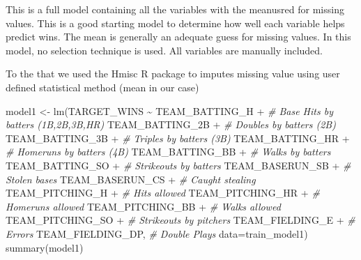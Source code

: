 \documentclass[
]{article}
\newenvironment{Shaded}{\begin{snugshade}}{\end{snugshade}}
\newcommand{\AttributeTok}[1]{\textcolor[rgb]{0.77,0.63,0.00}{#1}}
\newcommand{\CommentTok}[1]{\textcolor[rgb]{0.56,0.35,0.01}{\textit{#1}}}
\newcommand{\FunctionTok}[1]{\textcolor[rgb]{0.00,0.00,0.00}{#1}}
\newcommand{\NormalTok}[1]{#1}
\newcommand{\OtherTok}[1]{\textcolor[rgb]{0.56,0.35,0.01}{#1}}
\newcommand{\SpecialCharTok}[1]{\textcolor[rgb]{0.00,0.00,0.00}{#1}}
\begin{document}
This is a full model containing all the variables with the meanusred for
missing values. This is a good starting model to determine how well each
variable helps predict wins. The mean is generally an adequate guess for
missing values. In this model, no selection technique is used. All
variables are manually included.

To the that we used the Hmisc R package to imputes missing value using
user defined statistical method (mean in our case)

\begin{Shaded}
\begin{Highlighting}[]
\NormalTok{model1 }\OtherTok{\textless{}{-}} \FunctionTok{lm}\NormalTok{(TARGET\_WINS }\SpecialCharTok{\textasciitilde{}} 
\NormalTok{               TEAM\_BATTING\_H }\SpecialCharTok{+}   \CommentTok{\# Base Hits by batters (1B,2B,3B,HR)}
\NormalTok{               TEAM\_BATTING\_2B }\SpecialCharTok{+}  \CommentTok{\# Doubles by batters (2B) }
\NormalTok{               TEAM\_BATTING\_3B }\SpecialCharTok{+}  \CommentTok{\# Triples by batters (3B)}
\NormalTok{               TEAM\_BATTING\_HR }\SpecialCharTok{+}  \CommentTok{\# Homeruns by batters (4B) }
\NormalTok{               TEAM\_BATTING\_BB }\SpecialCharTok{+}  \CommentTok{\# Walks by batters}
\NormalTok{               TEAM\_BATTING\_SO }\SpecialCharTok{+}  \CommentTok{\# Strikeouts by batters }
\NormalTok{               TEAM\_BASERUN\_SB }\SpecialCharTok{+}  \CommentTok{\# Stolen bases}
\NormalTok{               TEAM\_BASERUN\_CS }\SpecialCharTok{+}  \CommentTok{\# Caught stealing }
\NormalTok{               TEAM\_PITCHING\_H }\SpecialCharTok{+}  \CommentTok{\# Hits allowed}
\NormalTok{               TEAM\_PITCHING\_HR }\SpecialCharTok{+} \CommentTok{\# Homeruns allowed}
\NormalTok{               TEAM\_PITCHING\_BB }\SpecialCharTok{+} \CommentTok{\# Walks allowed}
\NormalTok{               TEAM\_PITCHING\_SO }\SpecialCharTok{+} \CommentTok{\# Strikeouts by pitchers}
\NormalTok{               TEAM\_FIELDING\_E }\SpecialCharTok{+}  \CommentTok{\# Errors}
\NormalTok{               TEAM\_FIELDING\_DP,  }\CommentTok{\# Double Plays}
             \AttributeTok{data=}\NormalTok{train\_model1)}
\FunctionTok{summary}\NormalTok{(model1)}
\end{Highlighting}
\end{Shaded}
\end{document}
